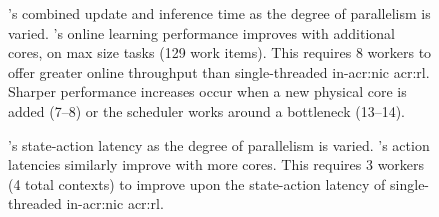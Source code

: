 \begin{figure}
	\caption[\approachshort{}'s combined update and inference time as the degree of parallelism is varied.]{
		\approachshort{}'s combined update and inference time as the degree of parallelism is varied. \Coopfw{}'s online learning performance improves with additional cores, on max size tasks (\num{129} work items). This requires \num{8} workers to offer greater online throughput than single-threaded in-\gls{acr:nic} \gls{acr:rl}. Sharper performance increases occur when a new physical core is added (\numrange{7}{8}) or the scheduler works around a bottleneck (\numrange{13}{14}).\label{fig:vary-core}}
\end{figure}

\begin{figure}
	\caption[\approachshort{}'s state-action latency as the degree of parallelism is varied.]{\approachshort{}'s state-action latency as the degree of parallelism is varied. \Coopfw{}'s action latencies similarly improve with more cores. This requires \num{3} workers (4 total contexts) to improve upon the state-action latency of single-threaded in-\gls{acr:nic} \gls{acr:rl}.\label{fig:vary-core-latency}}
\end{figure}


